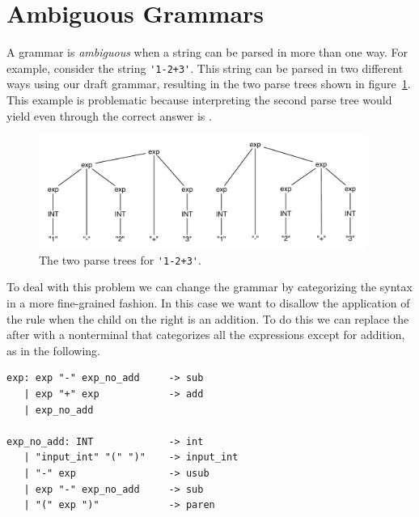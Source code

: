 \documentclass[7x10]{TimesAPriori_MIT}%
\numberwithin{theorem}{chapter}
\numberwithin{definition}{chapter}
\numberwithin{equation}{chapter}
\begin{document}
{\section{Ambiguous Grammars}

A grammar is \emph{ambiguous} when a string
can be parsed in more than one way. For example, consider the string
\lstinline{'1-2+3'}.  This string can be parsed in two different ways using
our draft grammar, resulting in the two parse trees shown in
figure~\ref{fig:ambig-parse-tree}. This example is problematic because
interpreting the second parse tree would yield  even through
the correct answer is .

\begin{figure}[tbp]
\begin{tcolorbox}[colback=white]
\centering
\includegraphics[width=0.95\textwidth]{figs/ambig-parse-tree}
\end{tcolorbox}
\caption{The two parse trees for \lstinline{'1-2+3'}.}
\label{fig:ambig-parse-tree}
\end{figure}

To deal with this problem we can change the grammar by categorizing
the syntax in a more fine-grained fashion. In this case we want to
disallow the application of the rule  when the
child on the right is an addition.  To do this we can replace the
 after  with a nonterminal that categorizes all
the expressions except for addition, as in the following.
\begin{center}
\begin{minipage}{0.95\textwidth}
\begin{lstlisting}[escapechar=$]
exp: exp "-" exp_no_add     -> sub
   | exp "+" exp            -> add
   | exp_no_add

exp_no_add: INT             -> int
   | "input_int" "(" ")"    -> input_int
   | "-" exp                -> usub
   | exp "-" exp_no_add     -> sub
   | "(" exp ")"            -> paren
\end{lstlisting}
\end{minipage}
\end{center}

}
\end{document}
